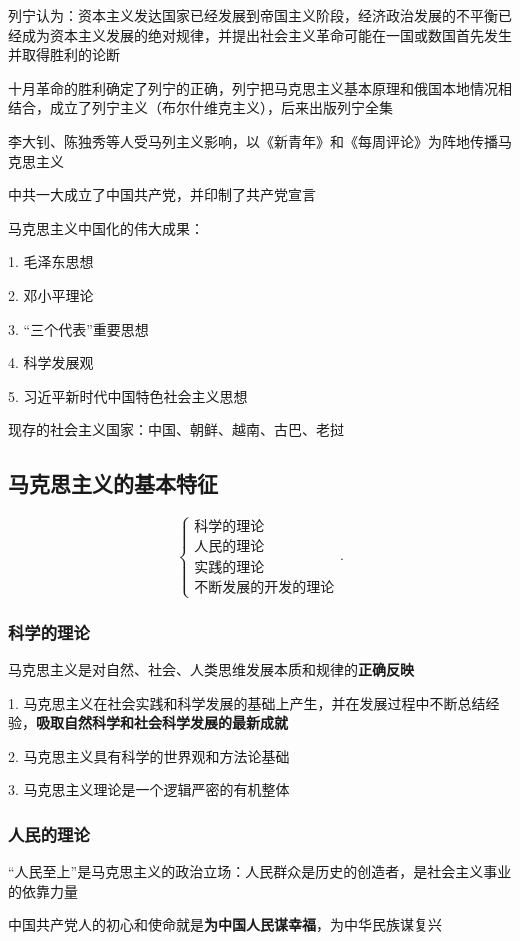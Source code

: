 列宁认为：资本主义发达国家已经发展到帝国主义阶段，经济政治发展的不平衡已经成为资本主义发展的绝对规律，并提出社会主义革命可能在一国或数国首先发生并取得胜利的论断

\begin{notation}
    十月革命的胜利确定了列宁的正确，列宁把马克思主义基本原理和俄国本地情况相结合，成立了列宁主义（布尔什维克主义），后来出版列宁全集
\end{notation}
李大钊、陈独秀等人受马列主义影响，以《新青年》和《每周评论》为阵地传播马克思主义

中共一大成立了中国共产党，并印制了共产党宣言

\begin{notation}
    马克思主义中国化的伟大成果：

    1. 毛泽东思想

    2. 邓小平理论

    3. “三个代表”重要思想

    4. 科学发展观

    5. 习近平新时代中国特色社会主义思想
\end{notation}
\begin{notation}
    现存的社会主义国家：中国、朝鲜、越南、古巴、老挝
\end{notation}

\subsection{马克思主义的基本特征}%
\label{sub:马克思主义的基本特征}
\[
    \begin{cases}
        \text{科学的理论}\\ 
        \text{人民的理论}\\ 
        \text{实践的理论}\\ 
        \text{不断发展的开发的理论}
    \end{cases}
.\] 
\subsubsection{科学的理论}%
\label{subsub:科学的理论}
马克思主义是对自然、社会、人类思维发展本质和规律的\textbf{正确反映}

1. 马克思主义在社会实践和科学发展的基础上产生，并在发展过程中不断总结经验，\textbf{吸取自然科学和社会科学发展的最新成就}

2. 马克思主义具有科学的世界观和方法论基础

3. 马克思主义理论是一个逻辑严密的有机整体

\subsubsection{人民的理论}%
\label{subsub:人民的理论}
“人民至上”是马克思主义的政治立场：人民群众是历史的创造者，是社会主义事业的依靠力量
\begin{notation}
    中国共产党人的初心和使命就是\textbf{为中国人民谋幸福}，为中华民族谋复兴
\end{notation}
